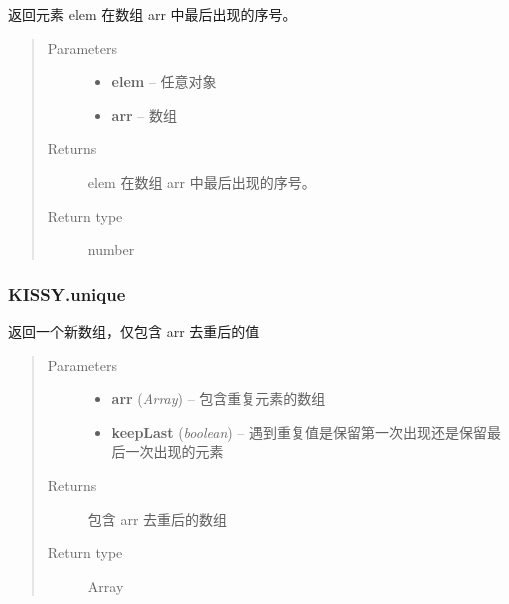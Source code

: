 \documentclass[letterpaper,10pt,english]{sphinxmanual}
\begin{document}
\begin{fulllineitems}
\label{api/seed/lang/lastIndexOf:Lang.KISSY.lastIndexOf}
返回元素 elem 在数组 arr 中最后出现的序号。
\begin{quote}\begin{description}
\item[{Parameters}] \leavevmode\begin{itemize}
\item {}
\textbf{elem} -- 任意对象

\item {}
\textbf{arr} -- 数组

\end{itemize}

\item[{Returns}] \leavevmode
elem 在数组 arr 中最后出现的序号。

\item[{Return type}] \leavevmode
number

\end{description}\end{quote}

\end{fulllineitems}



\subsubsection{KISSY.unique}
\label{api/seed/lang/unique:kissy-unique}\label{api/seed/lang/unique::doc}

\begin{fulllineitems}
\label{api/seed/lang/unique:Lang.KISSY.unique}
返回一个新数组，仅包含 arr 去重后的值
\begin{quote}\begin{description}
\item[{Parameters}] \leavevmode\begin{itemize}
\item {}
\textbf{arr} (\emph{Array}) -- 包含重复元素的数组

\item {}
\textbf{keepLast} (\emph{boolean}) -- 遇到重复值是保留第一次出现还是保留最后一次出现的元素

\end{itemize}

\item[{Returns}] \leavevmode
包含 arr 去重后的数组

\item[{Return type}] \leavevmode
Array

\end{description}\end{quote}

\end{fulllineitems}
\end{document}
